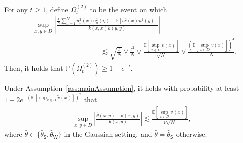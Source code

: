 \documentclass[10pt,a4paper]{amsart}
\newcommand{\E}{\mathbb{E}}
\renewcommand{\P}{\mathbb{P}}
\newcommand{\abs}[1]{\ensuremath{\left\lvert #1 \right\rvert}}
\newcommand{\hattheta}{\hat{\theta}}
\newcommand{\tildev}{\tilde{v}}
\begin{document}
\begin{lemma}\label{lem:SampleCovFnSquaredConcentration}
        For any $t \ge 1$, define $\Omega^{(2)}_t$ to be the event on which 
        \begin{align*}
            &\sup_{x,y \in D}
            \abs{\frac{
        \frac{1}{N} \sum_{n=1}^N u_n^2(x)u_n^2(y) 
        -
        \E [u^2(x)u^2(y)]
        }{k(x,x)k(y,y)} }\\
        &\hspace{4cm} \lesssim 
            \sqrt{\frac{t}{N}}
            \lor 
            \frac{t^2}{N}
            \lor 
            \frac{\E[\sup_{x \in D} \tildev(x)]}{\sqrt{N}}
            \lor 
            \frac{(\E[\sup_{x \in D} \tildev(x)])^4}{N}.
        \end{align*}
       Then, it holds that $\P(\Omega^{(2)}_t) \ge 1-e^{-t}.$ 
    \end{lemma}

\begin{lemma} \label{lem:AuxLem1}
Under Assumption~\ref{ass:mainAssumption}, it holds with probability at least $1-2 e^{-(\E[\sup_{x \in D} \tildev(x)])^2}$ that
\begin{align*}
    \sup_{x,y \in D}
    \abs{
    \frac{\hattheta(x,y)-\theta(x,y)}{\theta(x,y)}
    } 
    \lesssim \frac{\E[\sup_{x \in D} \tildev(x)]}{ \nu \sqrt{N}},
\end{align*}
where $\hattheta \in \{\hattheta_{\mathsf{S}},\hattheta_{\mathsf{W}}\}$ in the Gaussian setting, and $\hattheta = \hattheta_{\mathsf{S}}$ otherwise.
\end{lemma}
\end{document}
